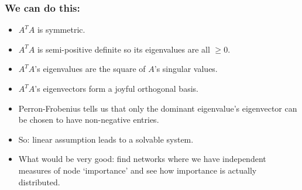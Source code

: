 \begin{frame}
  \frametitle{We can do this:}

  \begin{itemize}
  \item<1->
    $A^{T} A$ is symmetric.
  \item<2->
    $A^{T} A$ is semi-positive definite
    so its eigenvalues are all $\ge 0$.
  \item<3->
    $A^{T} A$'s eigenvalues are 
    the square of $A$'s singular values.
  \item<4->
    $A^{T} A$'s eigenvectors
    form a joyful orthogonal basis.
  \item<5->
    Perron-Frobenius tells us that 
    only the dominant eigenvalue's eigenvector
    can be chosen to have non-negative entries.
  \item<6->
    So: linear assumption leads to a solvable system.
  \item<7->
    What would be very good: find networks where
    we have independent measures of node `importance'
    and see how importance is actually distributed.
  \end{itemize}

\end{frame}


\begin{comment}
  
\section{Appendix}

\begin{frame}
  \frametitle{Perron-Frobenius}

  \begin{itemize}
  \item 
    Simple proof for symmetric matrices
  \end{itemize}

\end{frame}


\section{Summary}

\begin{frame}
  \frametitle{}

  \begin{itemize}
  \item 
  \end{itemize}

\end{frame}


\end{comment}
